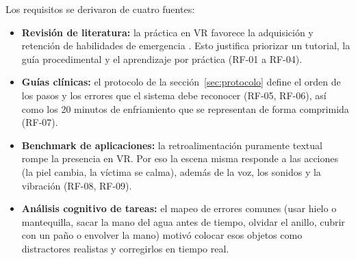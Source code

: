 \documentclass[11pt,a4paper]{article}
\begin{document}
Los requisitos se derivaron de cuatro fuentes:
\begin{itemize}
    \item \textbf{Revisión de literatura:} la práctica en VR favorece la adquisición y retención de habilidades de emergencia \cite{abbas2023}. Esto justifica priorizar un tutorial, la guía procedimental y el aprendizaje por práctica (RF-01 a RF-04).
    \item \textbf{Guías clínicas:} el protocolo de la sección~\ref{sec:protocolo} define el orden de los pasos y los errores que el sistema debe reconocer (RF-05, RF-06), así como los 20 minutos de enfriamiento que se representan de forma comprimida (RF-07).
    \item \textbf{Benchmark de aplicaciones:} la retroalimentación puramente textual rompe la presencia en VR. Por eso la escena misma responde a las acciones (la piel cambia, la víctima se calma), además de la voz, los sonidos y la vibración (RF-08, RF-09).
    \item \textbf{Análisis cognitivo de tareas:} el mapeo de errores comunes (usar hielo o mantequilla, sacar la mano del agua antes de tiempo, olvidar el anillo, cubrir con un paño o envolver la mano) motivó colocar esos objetos como distractores realistas y corregirlos en tiempo real.
\end{itemize}
\end{document}
